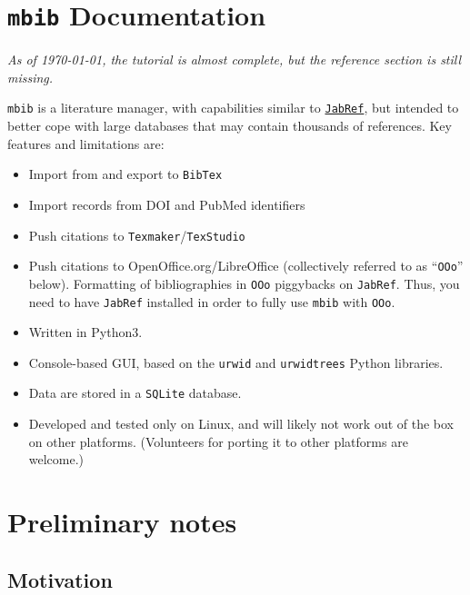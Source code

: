 \documentclass[10pt]{article}
\newcommand*{\mbib}{\texttt{mbib}\xspace}
\newcommand*{\jabref}{\texttt{JabRef}\xspace}
\newcommand*{\ooo}{\texttt{OOo}\xspace}
\newcommand*{\bibtex}{\texttt{BibTex}\xspace}
\newcommand*{\sqlite}{\texttt{SQLite}\xspace}
\begin{document}
\section*{\mbib Documentation}

\emph{As of \today, the tutorial is almost complete, but the reference section is still missing.}

\bigskip

\noindent \mbib is a literature manager, with capabilities similar to \href{http://www.jabref.org}{\jabref}, but intended to better cope with large databases that may contain thousands of references.  Key features and limitations are:

\begin{itemize}
\item Import from and export to \bibtex  

\item Import records from DOI and PubMed identifiers

\item Push citations to \texttt{Texmaker}/\texttt{TexStudio}

\item Push citations to OpenOffice.org/LibreOffice (collectively referred to as ``\ooo'' below). Formatting of bibliographies in \ooo piggybacks on \jabref. Thus, you need to have \jabref installed in order to fully use \mbib with \ooo.

\item Written in Python3.

\item Console-based GUI, based on the \texttt{urwid} and
\texttt{urwidtrees} Python libraries. 

\item Data are stored in a \sqlite database.

\item Developed and tested only on Linux, and will likely not work out of the box on other platforms. (Volunteers for porting it to other platforms are welcome.)

\end{itemize}

\section{Preliminary notes}

\subsection{Motivation}
\end{document}
